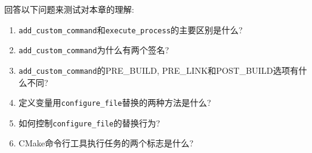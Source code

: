 回答以下问题来测试对本章的理解:

\begin{enumerate}
\item 
\texttt{add\_custom\_command}和\texttt{execute\_process}的主要区别是什么?

\item 
\texttt{add\_custom\_command}为什么有两个签名?

\item 
\texttt{add\_custom\_command}的PRE\_BUILD, PRE\_LINK和POST\_BUILD选项有什么不同?

\item 
定义变量用\texttt{configure\_file}替换的两种方法是什么?

\item 
如何控制\texttt{configure\_file}的替换行为?

\item 
CMake命令行工具执行任务的两个标志是什么?
\end{enumerate}